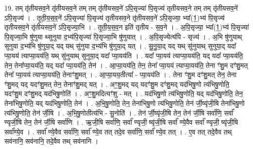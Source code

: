 \documentclass[17pt]{extarticle}
\begin{document}
19. तम् तृ॑तीयसव॒ने तृ॑तीयसव॒ने तम् तम् तृ॑तीयसव॒ने॑ ऽपि॒सृज्या॑ पि॒सृज्य॑ तृतीयसव॒ने तम् तम् तृ॑तीयसव॒ने॑ ऽपि॒सृज्य॑ । . तृ॒ती॒य॒स॒व॒ने॑ ऽपि॒सृज्या॑ पि॒सृज्य॑ तृतीयसव॒ने तृ॑तीयसव॒ने॑ ऽपि॒सृज्या॒ भ्या᳚(1॒)भ्य॑ पि॒सृज्य॑ तृतीयसव॒ने तृ॑तीयसव॒ने॑ ऽपि॒सृज्या॒भि । . तृ॒ती॒य॒स॒व॒न इति॑ तृतीय - स॒व॒ने । . अ॒पि॒सृज्या॒ भ्या᳚(1॒)भ्य॑ पि॒सृज्या॑ पि॒सृज्या॒भि षु॑णुया थ्सुनुया द॒भ्य॑पि॒सृज्या॑ पि॒सृज्या॒भि षु॑णुयात् । . अ॒पि॒सृज्येत्य॑पि - सृज्य॑ । . अ॒भि षु॑णुयाथ् सुनुया द॒भ्य॑भि षु॑णुया॒द् यद् यथ् सु॑नुया द॒भ्य॑भि षु॑णुया॒द् यत् । . सु॒नु॒या॒द् यद् यथ् सु॑नुयाथ् सुनुया॒द् यदा᳚ प्या॒यय॑ त्याप्या॒यय॑ति॒ यथ् सु॑नुयाथ् सुनुया॒द् यदा᳚ प्या॒यय॑ति । . यदा᳚ प्या॒यय॑ त्याप्या॒यय॑ति॒ यद् यदा᳚ प्या॒यय॑ति॒ तेन॒ तेना᳚प्या॒यय॑ति॒ यद् यदा᳚ प्या॒यय॑ति॒ तेन॑ । . आ॒प्या॒यय॑ति॒ तेन॒ तेना᳚ प्या॒यय॑ त्याप्या॒यय॑ति॒ तेना ꣳ॑शु॒म दꣳ॑शु॒मत् तेना᳚ प्या॒यय॑ त्याप्या॒यय॑ति॒ तेनाꣳ॑शु॒मत् । . आ॒प्या॒यय॒तीत्या᳚ - प्या॒यय॑ति । . तेना ꣳ॑शु॒म दꣳ॑शु॒मत् तेन॒ तेना ꣳ॑शु॒मद् यद् यदꣳ॑शु॒मत् तेन॒ तेनाꣳ॑शु॒मद् यत् । . अꣳ॒॒शु॒मद् यद् यदꣳ॑शु॒म दꣳ॑शु॒मद् यद॑भिषु॒णो त्य॑भिषु॒णोति॒ यदꣳ॑शु॒म दꣳ॑शु॒मद् यद॑भिषु॒णोति॑ । . अꣳ॒॒शु॒मदित्यꣳ॑शु - मत् । . यद॑भिषु॒णो त्य॑भिषु॒णोति॒ यद् यद॑भिषु॒णोति॒ तेन॒ तेना॑भिषु॒णोति॒ यद् यद॑भिषु॒णोति॒ तेन॑ । . अ॒भि॒षु॒णोति॒ तेन॒ तेना॑भिषु॒णो त्य॑भिषु॒णोति॒ तेन॑ र्जी॒ष्यृ॑जी॒षि तेना॑भिषु॒णो त्य॑भिषु॒णोति॒ तेन॑ र्जी॒षि । . अ॒भि॒षु॒णोतीत्य॑भि - सु॒नोति॑ । . तेन॑ र्जी॒ष्यृ॑जी॒षि तेन॒ तेन॑ र्जी॒षि सर्वा॑णि॒ सर्वा᳚ ण्यृजी॒षि तेन॒ तेन॑ र्जी॒षि सर्वा॑णि । . ऋ॒जी॒षि सर्वा॑णि॒ सर्वा᳚ ण्यृजी॒ ष्यृ॑जी॒षि सर्वा᳚ ण्ये॒वैव सर्वा᳚ ण्यृजी॒ ष्यृ॑जी॒षि सर्वा᳚ण्ये॒व । . सर्वा᳚ ण्ये॒वैव सर्वा॑णि॒ सर्वा᳚ ण्ये॒व तत् तदे॒व सर्वा॑णि॒ सर्वा᳚ ण्ये॒व तत् । . ए॒व तत् तदे॒वैव तथ् सव॑नानि॒ सव॑नानि॒ तदे॒वैव तथ् सव॑नानि । \newline
\end{document}
